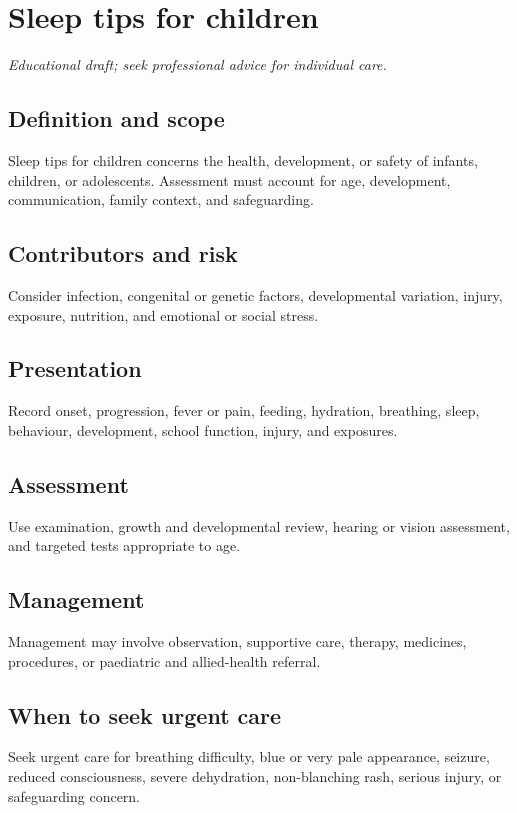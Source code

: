 \chapter{Sleep tips for children}
\medskip
\noindent\textit{Educational draft; seek professional advice for individual care.}

\section*{Definition and scope}
Sleep tips for children concerns the health, development, or safety of infants, children, or adolescents. Assessment must account for age, development, communication, family context, and safeguarding.

\section*{Contributors and risk}
Consider infection, congenital or genetic factors, developmental variation, injury, exposure, nutrition, and emotional or social stress.

\section*{Presentation}
Record onset, progression, fever or pain, feeding, hydration, breathing, sleep, behaviour, development, school function, injury, and exposures.

\section*{Assessment}
Use examination, growth and developmental review, hearing or vision assessment, and targeted tests appropriate to age.

\section*{Management}
Management may involve observation, supportive care, therapy, medicines, procedures, or paediatric and allied-health referral.

\section*{When to seek urgent care}
Seek urgent care for breathing difficulty, blue or very pale appearance, seizure, reduced consciousness, severe dehydration, non-blanching rash, serious injury, or safeguarding concern.

